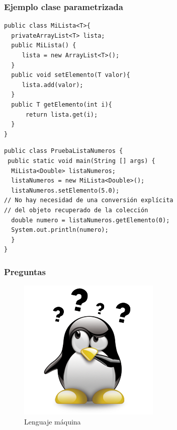 \documentclass{beamer}
\begin{document}
\begin{frame}[fragile]
\frametitle{Ejemplo clase parametrizada}
\begin{tiny}
\begin{multicols}{2}
\begin{verbatim}
public class MiLista<T>{
  privateArrayList<T> lista;
  public MiLista() {
     lista = new ArrayList<T>();
  }
  public void setElemento(T valor){
     lista.add(valor);
  }
  public T getElemento(int i){
      return lista.get(i);
  }
}
\end{verbatim}
\begin{verbatim}
public class PruebaListaNumeros {
 public static void main(String [] args) {
  MiLista<Double> listaNumeros;
  listaNumeros = new MiLista<Double>();
  listaNumeros.setElemento(5.0);
// No hay necesidad de una conversión explícita
// del objeto recuperado de la colección
  double numero = listaNumeros.getElemento(0);
  System.out.println(numero);
  }
}
\end{verbatim}
\end{multicols}
\end{tiny}
\end{frame}

\begin{frame}
\frametitle{Preguntas} 
\begin{figure}
\includegraphics[scale=0.9]{imagenes/dudas.png} 
\caption{Lenguaje máquina}
\end{figure} 
\end{frame}
\end{document}
